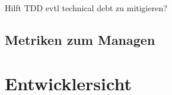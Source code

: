 \documentclass[12pt,DIV14,BCOR10mm,a4paper,twoside,parskip=half-,headsepline,headinclude,english,ngerman,bibliography=totocnumbered]{scrreprt}
\begin{document}
Hilft TDD evtl technical debt zu mitigieren?

\subsection{Metriken zum Managen}

\section{Entwicklersicht}

\printbibliography

\printacronyms[title=Abkürzungsverzeichnis,toctitle=Abkürzungsverzeichnis]
\printglossary[type=main]

\listoffigures      %

\end{document}
